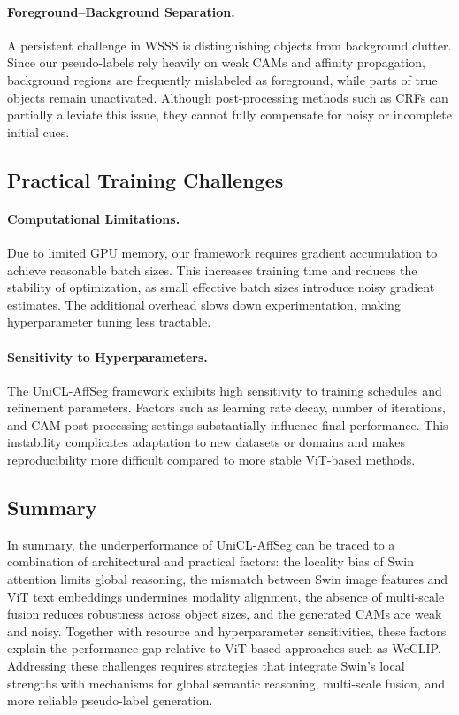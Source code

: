 \paragraph{Foreground–Background Separation.}
A persistent challenge in WSSS is distinguishing objects from background clutter. Since our pseudo-labels rely heavily on weak CAMs and affinity propagation, background regions are frequently mislabeled as foreground, while parts of true objects remain unactivated. Although post-processing methods such as CRFs can partially alleviate this issue, they cannot fully compensate for noisy or incomplete initial cues.

\subsection{Practical Training Challenges}

\paragraph{Computational Limitations.}
Due to limited GPU memory, our framework requires gradient accumulation to achieve reasonable batch sizes. This increases training time and reduces the stability of optimization, as small effective batch sizes introduce noisy gradient estimates. The additional overhead slows down experimentation, making hyperparameter tuning less tractable.

\paragraph{Sensitivity to Hyperparameters.}
The UniCL-AffSeg framework exhibits high sensitivity to training schedules and refinement parameters. Factors such as learning rate decay, number of iterations, and CAM post-processing settings substantially influence final performance. This instability complicates adaptation to new datasets or domains and makes reproducibility more difficult compared to more stable ViT-based methods.

\subsection{Summary}

In summary, the underperformance of UniCL-AffSeg can be traced to a combination of architectural and practical factors: the locality bias of Swin attention limits global reasoning, the mismatch between Swin image features and ViT text embeddings undermines modality alignment, the absence of multi-scale fusion reduces robustness across object sizes, and the generated CAMs are weak and noisy. Together with resource and hyperparameter sensitivities, these factors explain the performance gap relative to ViT-based approaches such as WeCLIP. Addressing these challenges requires strategies that integrate Swin’s local strengths with mechanisms for global semantic reasoning, multi-scale fusion, and more reliable pseudo-label generation.

